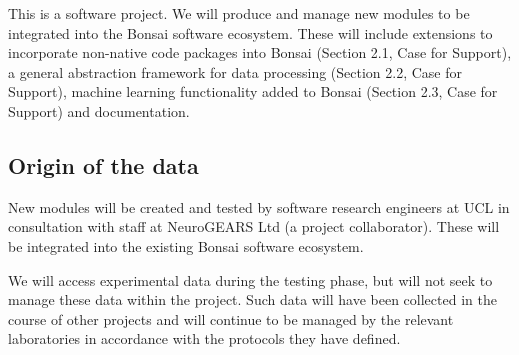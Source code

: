 \documentclass[a4paper,11pt]{article}
\begin{document}

This is a software project.  We will produce and manage new modules to be
integrated into the Bonsai software ecosystem.  These will include extensions
to incorporate non-native code packages into Bonsai (Section 2.1, Case for
Support), a general abstraction framework for data processing (Section 2.2,
Case for Support), machine learning functionality added to Bonsai (Section 2.3,
Case for Support) and documentation.


\subsection{Origin of the data}


New modules will be created and tested by software research engineers at UCL in consultation with staff at NeuroGEARS Ltd (a project collaborator).  These will be integrated into the existing Bonsai software ecosystem.

We will access experimental data during the testing phase, but will not seek to manage these data within the project.  Such data will have been collected in the course of other projects and will continue to be managed by the relevant laboratories in accordance with the protocols they have defined. 

\end{document}
